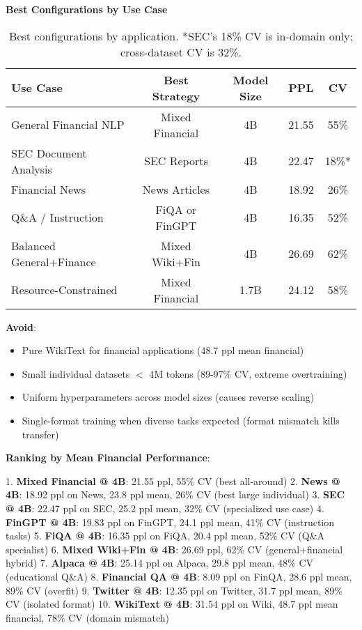 \textbf{Best Configurations by Use Case}

\begin{table}[h]
\centering
\small
\begin{tabular}{lcccc}
\toprule
\textbf{Use Case} & \textbf{Best Strategy} & \textbf{Model Size} & \textbf{PPL} & \textbf{CV} \\
\midrule
General Financial NLP & Mixed Financial & 4B & 21.55 & 55\% \\
SEC Document Analysis & SEC Reports & 4B & 22.47 & 18\%* \\
Financial News & News Articles & 4B & 18.92 & 26\% \\
Q\&A / Instruction & FiQA or FinGPT & 4B & 16.35 & 52\% \\
Balanced General+Finance & Mixed Wiki+Fin & 4B & 26.69 & 62\% \\
Resource-Constrained & Mixed Financial & 1.7B & 24.12 & 58\% \\
\bottomrule
\end{tabular}
\caption{Best configurations by application. *SEC's 18\% CV is in-domain only; cross-dataset CV is 32\%.}
\end{table}

\textbf{Avoid}:
\begin{itemize}
\item Pure WikiText for financial applications (48.7 ppl mean financial)
\item Small individual datasets $<$ 4M tokens (89-97\% CV, extreme overtraining)
\item Uniform hyperparameters across model sizes (causes reverse scaling)
\item Single-format training when diverse tasks expected (format mismatch kills transfer)
\end{itemize}

\textbf{Ranking by Mean Financial Performance}:

1. \textbf{Mixed Financial @ 4B}: 21.55 ppl, 55\% CV (best all-around)
2. \textbf{News @ 4B}: 18.92 ppl on News, 23.8 ppl mean, 26\% CV (best large individual)
3. \textbf{SEC @ 4B}: 22.47 ppl on SEC, 25.2 ppl mean, 32\% CV (specialized use case)
4. \textbf{FinGPT @ 4B}: 19.83 ppl on FinGPT, 24.1 ppl mean, 41\% CV (instruction tasks)
5. \textbf{FiQA @ 4B}: 16.35 ppl on FiQA, 20.4 ppl mean, 52\% CV (Q\&A specialist)
6. \textbf{Mixed Wiki+Fin @ 4B}: 26.69 ppl, 62\% CV (general+financial hybrid)
7. \textbf{Alpaca @ 4B}: 25.14 ppl on Alpaca, 29.8 ppl mean, 48\% CV (educational Q\&A)
8. \textbf{Financial QA @ 4B}: 8.09 ppl on FinQA, 28.6 ppl mean, 89\% CV (overfit)
9. \textbf{Twitter @ 4B}: 12.35 ppl on Twitter, 31.7 ppl mean, 89\% CV (isolated format)
10. \textbf{WikiText @ 4B}: 31.54 ppl on Wiki, 48.7 ppl mean financial, 78\% CV (domain mismatch)

